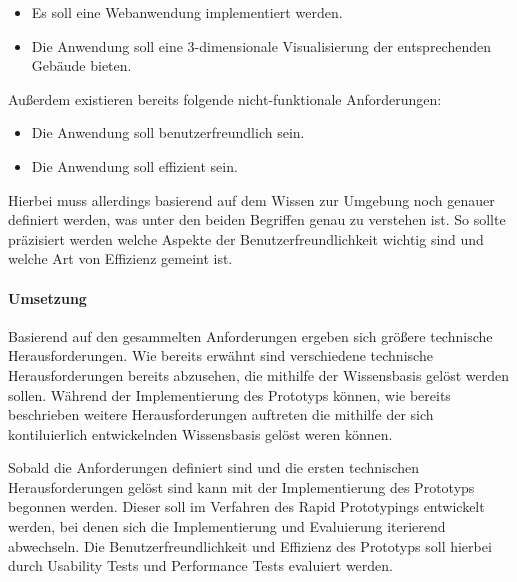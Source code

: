 \begin{itemize}
    \item Es soll eine Webanwendung implementiert werden.
    \item Die Anwendung soll eine 3-dimensionale Visualisierung der entsprechenden Gebäude bieten.
\end{itemize}

\begin{samepage}
Außerdem existieren bereits folgende nicht-funktionale Anforderungen:

\nopagebreak
\begin{itemize}
    \item Die Anwendung soll benutzerfreundlich sein.
    \item Die Anwendung soll effizient sein.
\end{itemize}
\end{samepage}

Hierbei muss allerdings basierend auf dem Wissen zur Umgebung noch genauer definiert werden, was unter den beiden Begriffen genau zu verstehen ist. So sollte  präzisiert werden welche Aspekte der Benutzerfreundlichkeit wichtig sind und welche Art von Effizienz gemeint ist.

\paragraph{Umsetzung}
Basierend auf den gesammelten Anforderungen ergeben sich größere technische Herausforderungen. Wie bereits erwähnt sind verschiedene technische Herausforderungen bereits abzusehen, die mithilfe der Wissensbasis gelöst werden sollen. Während der Implementierung des Prototyps können, wie bereits beschrieben weitere Herausforderungen auftreten die mithilfe der sich kontiluierlich entwickelnden Wissensbasis gelöst weren können.

Sobald die Anforderungen definiert sind und die ersten technischen Herausforderungen gelöst sind kann mit der Implementierung des Prototyps begonnen werden. Dieser soll im Verfahren des Rapid Prototypings entwickelt werden, bei denen sich die Implementierung und Evaluierung iterierend abwechseln. Die Benutzerfreundlichkeit und Effizienz des Prototyps soll hierbei durch Usability Tests und Performance Tests evaluiert werden.
